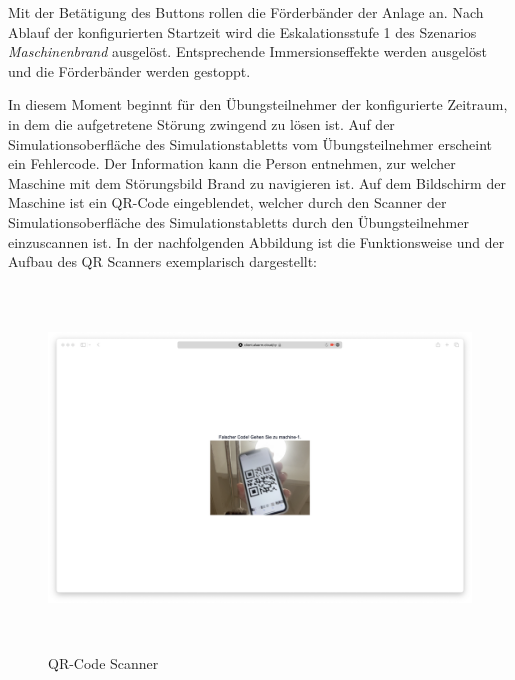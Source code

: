 Mit der Betätigung des Buttons rollen die Förderbänder der Anlage an. 
Nach Ablauf der konfigurierten Startzeit wird die Eskalationsstufe 1 des Szenarios \textit{Maschinenbrand} ausgelöst. Entsprechende Immersionseffekte werden ausgelöst und die Förderbänder werden gestoppt.

In diesem Moment beginnt für den Übungsteilnehmer der konfigurierte Zeitraum, in dem die aufgetretene Störung zwingend zu lösen ist. Auf der Simulationsoberfläche des Simulationstabletts vom Übungsteilnehmer erscheint ein Fehlercode. Der  Information kann die Person entnehmen, zur welcher Maschine mit dem Störungsbild Brand zu navigieren ist. Auf dem Bildschirm der Maschine ist ein QR-Code eingeblendet, welcher durch den Scanner der Simulationsoberfläche des Simulationstabletts durch den Übungsteilnehmer einzuscannen ist. In der nachfolgenden Abbildung ist die Funktionsweise und der Aufbau des QR Scanners exemplarisch dargestellt:

\begin{figure}[h]
   \includegraphics[width=15cm, height=9.61cm]{res/qr_code_scanner.png}
   \caption{QR-Code Scanner}
\end{figure}

